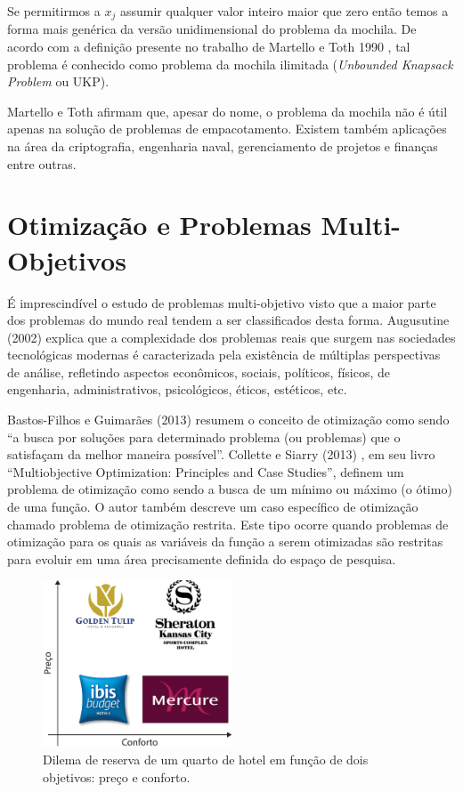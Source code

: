 Se permitirmos a \(x_{j}\) assumir qualquer valor inteiro maior que zero então temos a forma mais genérica da versão unidimensional do problema da mochila. De acordo com a definição presente no trabalho de Martello e Toth 1990 \cite{Martello:1990:KPA:98124}, tal problema é conhecido como problema da mochila ilimitada (\textit{Unbounded Knapsack Problem} ou UKP).

Martello e Toth afirmam que, apesar do nome, o problema da mochila não é útil apenas na solução de problemas de empacotamento. Existem também aplicações na área da criptografia, engenharia naval, gerenciamento de projetos e finanças entre outras.

\section{Otimização e Problemas Multi-Objetivos}
\label{sec-multi}

É imprescindível o estudo de problemas multi-objetivo visto que a maior parte dos problemas do mundo real tendem a ser classificados desta forma. Augusutine (2002) \cite{augustine2002offline} explica que a complexidade dos problemas reais que surgem nas sociedades tecnológicas modernas é caracterizada pela existência de múltiplas perspectivas de análise, refletindo aspectos econômicos, sociais, políticos, físicos, de engenharia, administrativos, psicológicos, éticos, estéticos, etc.

Bastos-Filhos e Guimarães (2013) \cite{bastos2015multi} resumem o conceito de otimização como sendo “a busca por soluções para determinado problema (ou problemas) que o satisfaçam da melhor maneira possível”. Collette e Siarry (2013) \cite{collette2013multiobjective}, em seu livro “Multiobjective Optimization: Principles and Case Studies”, definem um problema de otimização como sendo a busca de um mínimo ou máximo (o ótimo) de uma função. O autor também descreve um caso específico de otimização chamado problema de otimização restrita. Este tipo ocorre quando problemas de otimização para os quais as variáveis da função a serem otimizadas são restritas para evoluir em uma área precisamente definida do espaço de pesquisa.

\begin{figure}[htb]
	\centering
	\caption{\label{fig:hotel-multi}Dilema de reserva de um quarto de hotel em função de dois objetivos: preço e conforto.} 
	\includegraphics[width=0.5\textwidth]{imagens/hotel-multi.eps}
\end{figure}

